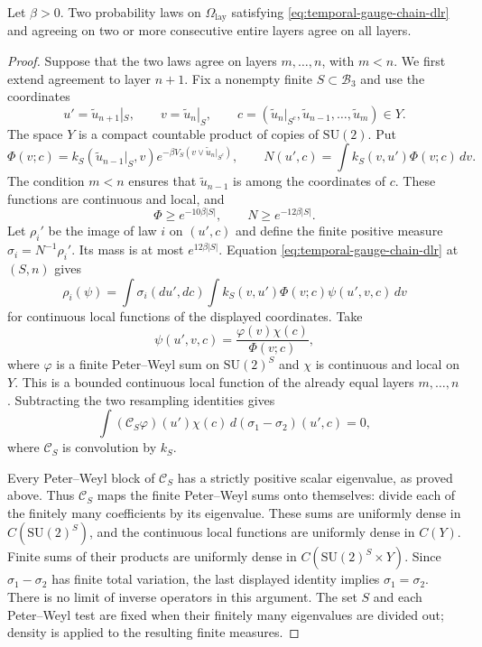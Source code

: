 \documentclass[11pt,letterpaper,reqno]{amsart}
\makeatletter
\theoremstyle{definition}
\newcommand{\ms@minorstart}{%
  \pushQED{\qed}\renewcommand{\qedsymbol}{$\blacksquare$}}
\newenvironment{lemma}[1][]{\ms@minorstart\ms@lemma[#1]}
  {\popQED\endms@lemma}
\theoremstyle{remark}
\newcommand{\SU}{\mathrm{SU}}
\makeatother
\begin{document}
\begin{lemma}\label{lem:layer-law-determination}
Let $\beta>0$. Two probability laws on $\Omega_{\mathrm{lay}}$
satisfying \eqref{eq:temporal-gauge-chain-dlr} and agreeing on two
or more consecutive entire layers agree on all layers.
\end{lemma}

\begin{proof}
Suppose that the two laws agree on layers $m,\ldots,n$, with $m<n$.
We first extend agreement to layer $n+1$. Fix a nonempty finite
$S\subset\mathcal B_3$ and use the coordinates
\[
 u'=\widetilde u_{n+1}|_S,\qquad v=\widetilde u_n|_S,\qquad
 c=(\widetilde u_n|_{S^c},\widetilde u_{n-1},\ldots,
                                      \widetilde u_m)\in Y.
\]
The space $Y$ is a compact countable product of copies of $\SU(2)$.
Put
\[
 \Phi(v;c)=k_S(\widetilde u_{n-1}|_S,v)
       e^{-\beta V_S(v\vee\widetilde u_n|_{S^c})},\qquad
 N(u',c)=\int k_S(v,u')\Phi(v;c)\,dv.
\]
The condition $m<n$ ensures that $\widetilde u_{n-1}$ is among the
coordinates of $c$. These functions are continuous and local, and
\[
 \Phi\ge e^{-10\beta|S|},\qquad N\ge e^{-12\beta|S|}.
\]
Let $\rho_i'$ be the image of law $i$ on $(u',c)$ and define the
finite positive measure $\sigma_i=N^{-1}\rho_i'$. Its mass is at
most $e^{12\beta|S|}$. Equation
\eqref{eq:temporal-gauge-chain-dlr} at $(S,n)$ gives
\begin{equation}\label{eq:layer-law-resampling}
 \rho_i(\psi)=\int\sigma_i(du',dc)\int
       k_S(v,u')\Phi(v;c)\psi(u',v,c)\,dv
\end{equation}
for continuous local functions of the displayed coordinates.
Take
\[
 \psi(u',v,c)=\frac{\varphi(v)\chi(c)}{\Phi(v;c)},
\]
where $\varphi$ is a finite Peter--Weyl sum on $\SU(2)^S$ and
$\chi$ is continuous and local on $Y$. This is a bounded continuous
local function of the already equal layers $m,\ldots,n$.
Subtracting the two resampling identities gives
\[
 \int (\mathcal C_S\varphi)(u')\chi(c)
                              \,d(\sigma_1-\sigma_2)(u',c)=0,
\]
where $\mathcal C_S$ is convolution by $k_S$.

Every Peter--Weyl block of $\mathcal C_S$ has a strictly positive
scalar eigenvalue, as proved above. Thus $\mathcal C_S$ maps the
finite Peter--Weyl sums onto themselves: divide each of the finitely
many coefficients by its eigenvalue. These sums are uniformly dense
in $C(\SU(2)^S)$, and the continuous local functions are uniformly
dense in $C(Y)$. Finite sums of their products are uniformly dense
in $C(\SU(2)^S\times Y)$. Since $\sigma_1-\sigma_2$ has finite
total variation, the last displayed identity implies
$\sigma_1=\sigma_2$.
There is no limit of inverse operators in this argument. The set
$S$ and each Peter--Weyl test are fixed when their finitely many
eigenvalues are divided out; density is applied to the resulting
finite measures.


\end{proof}
\end{document}
